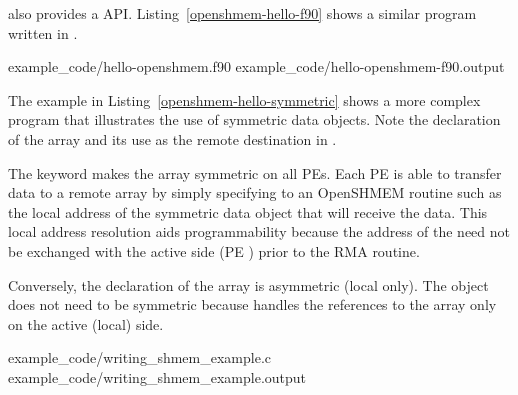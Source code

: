 \clearpage %

\begin{deprecate}
\openshmem also provides a \Fortran API. Listing~\ref{openshmem-hello-f90} shows a similar program written in \Fortran.

\begin{minipage}{\linewidth}
\vspace{0.1in}
                {example_code/hello-openshmem.f90}
                {example_code/hello-openshmem-f90.output}
\vspace{0.1in}
\end{minipage}
\end{deprecate}

\clearpage %

The example in Listing~\ref{openshmem-hello-symmetric} shows a more complex
\openshmem program that illustrates the use of symmetric data objects.
Note the declaration of the  array and its use as the
remote destination in \hyperref[subsec:shmem_put]{}.

The  keyword makes the  array symmetric on all \acp{PE}.
Each \ac{PE} is able to transfer data to a remote \dest{} array by simply
specifying to an OpenSHMEM routine such as \hyperref[subsec:shmem_put]{}
the local address of the symmetric data object that will receive the data.
This local address resolution aids programmability because the address of the
\dest{} need not be exchanged with the active side (\ac{PE} ) prior to
the \acf{RMA} routine.

Conversely, the declaration of the  array is asymmetric
(local only).
The \source{} object does not need to be symmetric because \PUT{} handles the
references to the  array only on the active (local) side.

\begin{minipage}{\linewidth}
\vspace{0.1in}
                {example_code/writing_shmem_example.c}
                {example_code/writing_shmem_example.output}
\vspace{0.1in}
\end{minipage}




